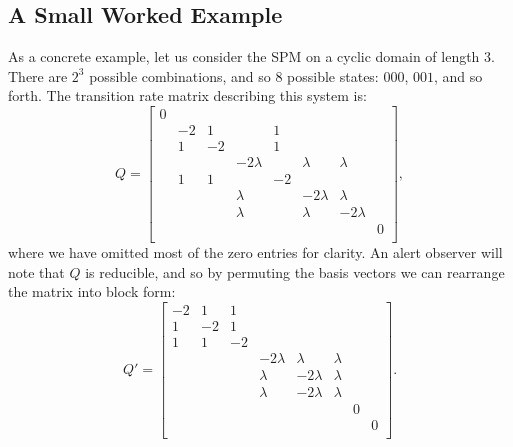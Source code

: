 \subsection{A Small Worked Example}

As a concrete example, let us consider the SPM on a cyclic domain of length $3$. There
are $2^3$ possible combinations, and so $8$ possible states: $000$, $001$, and so forth.
The transition rate matrix describing this system is:
\begin{equation}
 Q =
 \begin{bmatrix}
0  &   &   &           &   &   &   &   \\
   &-2 & 1 &           & 1 &   &   &   \\
   & 1 &-2 &           & 1 &   &   &   \\
   &   &   & -2\lambda &   &  \lambda &  \lambda &   \\
   & 1 & 1 &           & -2&   &   &   \\
   &   &   &  \lambda    &   &  -2\lambda & \lambda  &   \\
   &   &   &  \lambda  &    & \lambda  & -2 \lambda &   \\
   &   &   &           &   &   &   & 0  \\
\end{bmatrix},
\end{equation}
where we have omitted most of the zero entries for clarity.
An alert observer will note that $Q$ is reducible, and so by permuting the basis vectors
we can rearrange the matrix into block form:
\begin{equation}
 Q ' = 
 \begin{bmatrix}
-2  & 1 & 1 &           &   &   &   &   \\
 1 &-2 & 1 &           &  &   &   &   \\
 1 & 1 &-2 &           &  &   &   &   \\
   &   &   & -2\lambda & \lambda &  \lambda &   &    \\
   &   &   &      \lambda& -2\lambda   &  \lambda &   \\
   &   &   &  \lambda   &   -2\lambda & \lambda & &   \\
   &   &   &       &  &  & 0 &  \\
   &   &   &           &   &   &   & 0  \\
\end{bmatrix}.
\end{equation}

